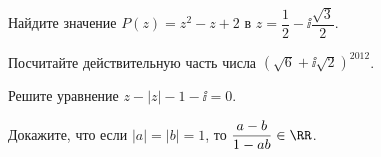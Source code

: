 %
%


\begin{problems}

\item
Найдите значение $P(z) = z^2 - z + 2$ в
$z = \dfrac{1}{2} - \ii \dfrac{\sqrt{3}}{2}$.

\item
Посчитайте действительную часть числа
$\left(\sqrt{6} + \ii \sqrt{2}\right)^{2012}$.

\item
Решите уравнение
$z - |z| - 1 - \ii = 0$.

\item
Докажите, что если
$|a| = |b| = 1$,
то
$\dfrac{a - b}{1 - a b} \in \RR$.

\end{problems}

